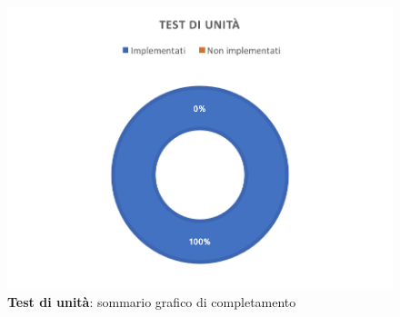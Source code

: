 \documentclass[../PianoDiQualifica_v4.0.0.tex]{subfiles}
\begin{document}
		\begin{figure}[!h]
			\centering
			\includegraphics{ImgTest/TU.png}
			\caption{\textbf{Test di unità}: sommario grafico di completamento}
			\label{fig:pieTU}
		\end{figure}

	\newpage
\end{document}
